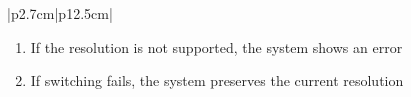 \begin{table}[H]
\begin{tabular}{|p{2.7cm}|p{12.5cm}|}
\begin{minipage}[t]{\linewidth}
                                          \begin{enumerate}[topsep=0pt,itemsep=1pt,parsep=0pt,partopsep=0pt]
                                              \item If the resolution is not supported, the system shows an error
                                              \item If switching fails, the system preserves the current resolution
                                          \end{enumerate}
                                      \end{minipage}        \\
            \hline
        \end{tabular}
        \label{tab:eng-set-resolution}
    \end{table}

